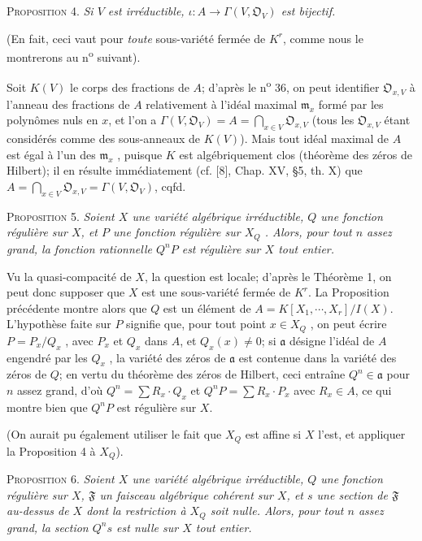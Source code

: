 \textsc{Proposition} 4. \textit{Si $V$ est irréductible, $\iota : A \to \Gamma(V, \mathfrak{O}_V)$ est bijectif.}

(En fait, ceci vaut pour \textit{toute} sous-variété fermée de $K^r$, comme nous le montrerons au n\textsuperscript{o} suivant).

Soit $K(V)$ le corps des fractions de $A$; d'après le n\textsuperscript{o} 36, on peut identifier $\mathfrak{O}_{x,V}$ à l'anneau des fractions de $A$ relativement à l'idéal maximal $\mathfrak{m}_x$ formé par les polynômes nuls en $x$, et l'on a $\Gamma(V, \mathfrak{O}_V) = A = \bigcap_{x \in V} \mathfrak{O}_{x,V}$ (tous les $\mathfrak{O}_{x,V}$ étant considérés comme des sous-anneaux de $K(V)$). Mais tout idéal maximal de $A$ est égal à l'un des $\mathfrak{m}_x$ , puisque $K$ est algébriquement clos (théorème des zéros de Hilbert); il en résulte immédiatement (cf. [8], Chap. XV, §5, th. X) que $A = \bigcap_{x \in V} \mathfrak{O}_{x,V} = \Gamma(V, \mathfrak{O}_V)$, cqfd.

\textsc{Proposition} 5. \textit{Soient $X$ une variété algébrique irréductible, $Q$ une fonction régulière sur $X$, et $P$ une fonction régulière sur $X_Q$ . Alors, pour tout $n$ assez grand, la fonction rationnelle $Q^nP$ est régulière sur $X$ tout entier.}

Vu la quasi-compacité de $X$, la question est locale; d'après le Théorème 1, on peut donc supposer que $X$ est une sous-variété fermée de $K^r$. La Proposition précédente montre alors que $Q$ est un élément de $A = K[X_1 , \cdots , X_r]/I(X)$. L'hypothèse faite sur $P$ signifie que, pour tout point $x \in X_Q$ , on peut écrire $P = P_x/Q_x$ , avec $P_x$ et $Q_x$ dans $A$, et $Q_x(x) \neq 0$; si $\mathfrak{a}$ désigne l'idéal de $A$ engendré par les $Q_x$ , la variété des zéros de $\mathfrak{a}$ est contenue dans la variété des zéros de $Q$; en vertu du théorème des zéros de Hilbert, ceci entraîne $Q^n \in \mathfrak{a}$ pour $n$ assez grand, d'où $Q^n = \sum R_x \cdot Q_x$ et $Q^nP = \sum R_x \cdot P_x$ avec $R_x \in A$, ce qui montre bien que $Q^nP$ est régulière sur $X$.

(On aurait pu également utiliser le fait que $X_Q$ est affine si $X$ l'est, et appliquer la Proposition 4 à $X_Q$).

\textsc{Proposition} 6. \textit{Soient $X$ une variété algébrique irréductible, $Q$ une fonction régulière sur $X$, $\mathfrak{F}$ un faisceau algébrique cohérent sur $X$, et $s$ une section de $\mathfrak{F}$ au-dessus de $X$ dont la restriction à $X_Q$ soit nulle. Alors, pour tout $n$ assez grand, la section $Q^ns$ est nulle sur $X$ tout entier.}

